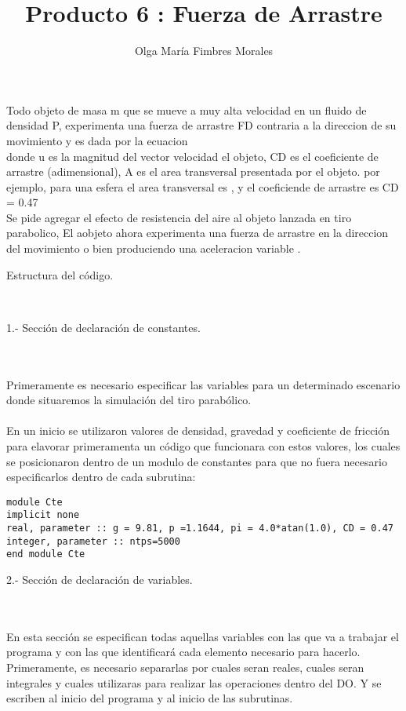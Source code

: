 \documentclass[12pt]{article}
\title{Producto 6 : Fuerza de Arrastre}
\author{Olga María Fimbres Morales}
\date{}
\begin{document}
\maketitle


 
 Todo objeto de masa m que se mueve a muy alta velocidad en un fluido de densidad P, experimenta una fuerza de arrastre FD contraria a la direccion de su movimiento y es dada por la ecuacion \\

donde u es la magnitud del vector velocidad el objeto, CD es el coeficiente de arrastre (adimensional), A es el area transversal presentada por el objeto. por ejemplo, para una esfera el area transversal es  , y el coeficiende de arrastre es CD = 0.47\\

Se pide agregar el efecto de resistencia del aire al objeto lanzada en tiro parabolico, El aobjeto ahora experimenta una fuerza de arrastre en la direccion del movimiento    o bien produciendo una aceleracion variable   .


\newpage
\begin{LARGE}
Estructura del código.
\end{LARGE}\\

\begin{large}
1.- Sección de declaración de constantes.
\end{large}\\
\\
Primeramente es necesario especificar las variables para un determinado escenario donde situaremos la simulación del tiro parabólico.\\ 
\\
En un inicio se utilizaron valores de densidad, gravedad y coeficiente de fricción para elavorar primeramenta un código que funcionara con estos valores, los cuales se posicionaron dentro de un modulo de constantes para que no fuera necesario especificarlos dentro de cada subrutina:
\begin{center}
\begin{verbatim}
module Cte
implicit none 
real, parameter :: g = 9.81, p =1.1644, pi = 4.0*atan(1.0), CD = 0.47
integer, parameter :: ntps=5000
end module Cte
\end{verbatim}
\end{center}

\begin{large}
2.- Sección de declaración de variables.
\end{large}\\
\\
En esta sección se especifican todas aquellas variables con las que va a trabajar el programa y con las que identificará cada elemento necesario para hacerlo. Primeramente, es necesario separarlas por cuales seran reales, cuales seran integrales y cuales utilizaras para realizar las operaciones dentro del DO. Y se escriben al inicio del programa y al inicio de las subrutinas.
\end{document}

